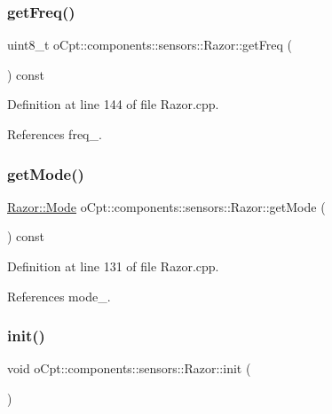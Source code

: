 \subsubsection{\texorpdfstring{get\+Freq()}{getFreq()}}
{\footnotesize\ttfamily uint8\+\_\+t o\+Cpt\+::components\+::sensors\+::\+Razor\+::get\+Freq (\begin{DoxyParamCaption}{ }\end{DoxyParamCaption}) const}



Definition at line 144 of file Razor.\+cpp.



References freq\+\_\+.

\hypertarget{classo_cpt_1_1components_1_1sensors_1_1_razor_ae9d8191555b521ee02cc26e387c900b1}{}\label{classo_cpt_1_1components_1_1sensors_1_1_razor_ae9d8191555b521ee02cc26e387c900b1} 
\subsubsection{\texorpdfstring{get\+Mode()}{getMode()}}
{\footnotesize\ttfamily \hyperlink{classo_cpt_1_1components_1_1sensors_1_1_razor_afed258e485aaaf9193a57d649ccb159b}{Razor\+::\+Mode} o\+Cpt\+::components\+::sensors\+::\+Razor\+::get\+Mode (\begin{DoxyParamCaption}{ }\end{DoxyParamCaption}) const}



Definition at line 131 of file Razor.\+cpp.



References mode\+\_\+.

\hypertarget{classo_cpt_1_1components_1_1sensors_1_1_razor_a1dd2b5a9fbac3c9510e2d3771abf358b}{}\label{classo_cpt_1_1components_1_1sensors_1_1_razor_a1dd2b5a9fbac3c9510e2d3771abf358b} 
\subsubsection{\texorpdfstring{init()}{init()}}
{\footnotesize\ttfamily void o\+Cpt\+::components\+::sensors\+::\+Razor\+::init (\begin{DoxyParamCaption}{ }\end{DoxyParamCaption})\hspace{0.3cm}{\ttfamily [virtual]}}

